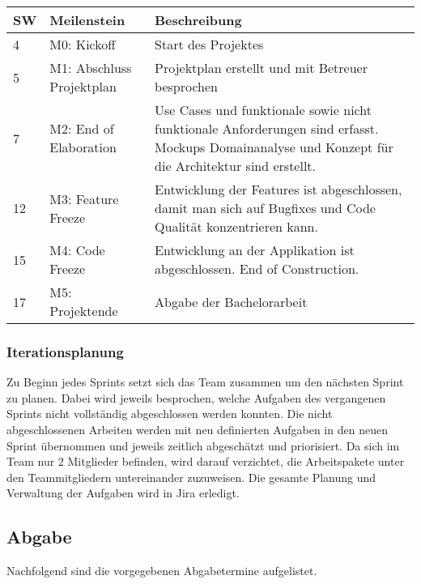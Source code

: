 \begin{center}
	\begin{tabularx}{\textwidth}{p{} p{} p{}}
	\toprule
	SW & Meilenstein & Beschreibung \\ \midrule
	4 & M0: Kickoff & Start des Projektes \\ 
	5 & M1: Abschluss Projektplan & Projektplan erstellt und mit Betreuer \newline besprochen \\
	7 & M2: End of Elaboration & Use Cases und funktionale sowie nicht \newline funktionale Anforderungen sind erfasst. \newline Mockups Domainanalyse und Konzept für \newline die Architektur sind erstellt. \\
	12 & M3: Feature Freeze & Entwicklung der Features ist \newline abgeschlossen, damit man sich auf Bugfixes \newline und Code Qualität konzentrieren kann.\\
	15 & M4: Code Freeze & Entwicklung an der Applikation ist \newline abgeschlossen. End of Construction.\\
	17 & M5: Projektende & Abgabe der Bachelorarbeit \\ \bottomrule
	\end{tabularx}
\end{center}

\subsubsection{Iterationsplanung}
Zu Beginn jedes Sprints setzt sich das Team zusammen um den nächsten Sprint zu planen. Dabei wird jeweils besprochen, welche Aufgaben des vergangenen Sprints nicht vollständig abgeschlossen werden konnten. Die nicht abgeschlossenen Arbeiten werden mit neu definierten Aufgaben in den neuen Sprint übernommen und jeweils zeitlich abgeschätzt und priorisiert. Da sich im Team nur 2 Mitglieder befinden, wird darauf verzichtet, die Arbeitspakete unter den Teammitgliedern untereinander zuzuweisen. Die gesamte Planung und Verwaltung der Aufgaben wird in Jira erledigt.

\subsection{Abgabe}
Nachfolgend sind die vorgegebenen Abgabetermine aufgelistet.

